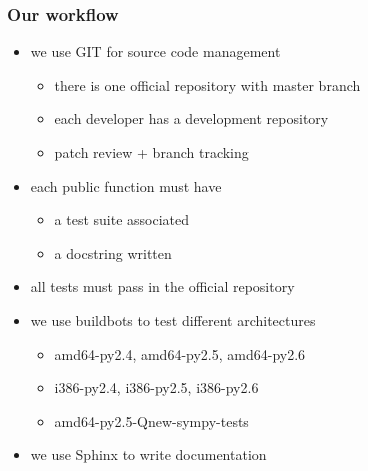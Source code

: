 \documentclass{beamer}
\begin{document}
\begin{frame}[fragile]
    \frametitle{Our workflow}

    \begin{itemize}
        \item we use GIT for source code management
            \begin{itemize}
                \item there is one official repository with master branch
                \item each developer has a development repository
                \item patch review + branch tracking
            \end{itemize}
        \item each public function must have
        \begin{itemize}
            \item a test suite associated
            \item a docstring written 
        \end{itemize}
        \item all tests must pass in the official repository
        \item we use buildbots to test different architectures
        \begin{itemize}
            \item amd64-py2.4, amd64-py2.5, amd64-py2.6
            \item i386-py2.4, i386-py2.5, i386-py2.6
            \item amd64-py2.5-Qnew-sympy-tests
        \end{itemize}
        \item we use Sphinx to write documentation
    \end{itemize}
\end{frame}
\end{document}
